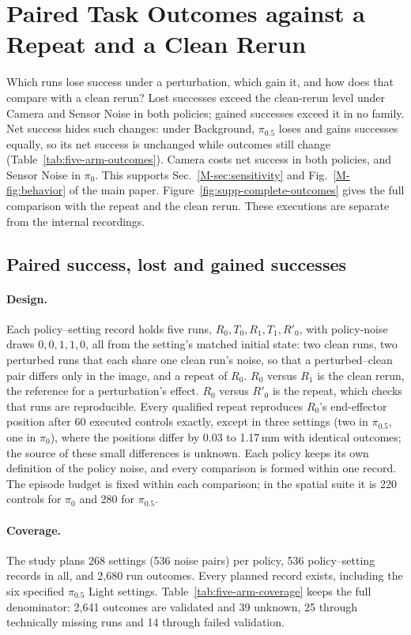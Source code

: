 \section{Paired Task Outcomes against a Repeat and a Clean Rerun}
\label{sec:five-arm}
Which runs lose success under a perturbation, which gain it, and how does that compare with a clean rerun? Lost successes exceed the clean-rerun level under Camera and Sensor Noise in both policies; gained successes exceed it in no family. Net success hides such changes: under Background, $\pi_{0.5}$ loses and gains successes equally, so its net success is unchanged while outcomes still change (Table~\ref{tab:five-arm-outcomes}). Camera costs net success in both policies, and Sensor Noise in $\pi_0$. This supports Sec.~\ref*{M-sec:sensitivity} and Fig.~\ref*{M-fig:behavior} of the main paper. Figure~\ref{fig:supp-complete-outcomes} gives the full comparison with the repeat and the clean rerun. These executions are separate from the internal recordings.

\subsection{Paired success, lost and gained successes}
\paragraph{Design.}
Each policy--setting record holds five runs, $R_0,T_0,R_1,T_1,R'_0$, with policy-noise draws $0,0,1,1,0$, all from the setting's matched initial state: two clean runs, two perturbed runs that each share one clean run's noise, so that a perturbed--clean pair differs only in the image, and a repeat of $R_0$. $R_0$ versus $R_1$ is the clean rerun, the reference for a perturbation's effect. $R_0$ versus $R'_0$ is the repeat, which checks that runs are reproducible. Every qualified repeat reproduces $R_0$'s end-effector position after 60 executed controls exactly, except in three settings (two in $\pi_{0.5}$, one in $\pi_0$), where the positions differ by 0.03 to 1.17\,mm with identical outcomes; the source of these small differences is unknown. Each policy keeps its own definition of the policy noise, and every comparison is formed within one record. The episode budget is fixed within each comparison; in the spatial suite it is 220 controls for $\pi_0$ and 280 for $\pi_{0.5}$.

\paragraph{Coverage.}
The study plans 268 settings (536 noise pairs) per policy, 536 policy--setting records in all, and 2,680 run outcomes. Every planned record exists, including the six specified $\pi_{0.5}$ Light settings. Table~\ref{tab:five-arm-coverage} keeps the full denominator: 2,641 outcomes are validated and 39 unknown, 25 through technically missing runs and 14 through failed validation.

